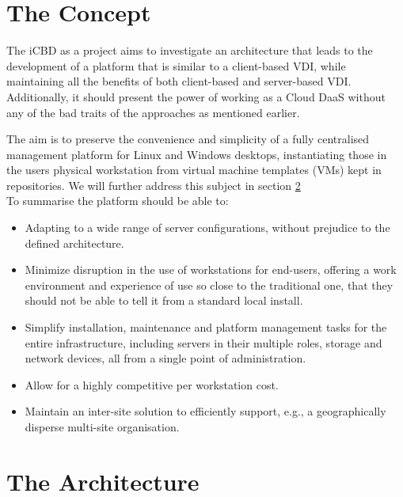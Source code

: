 \section{The Concept} %
\label{sec:icbd_concept}

The iCBD as a project aims to investigate an architecture that leads to the development of a platform that is similar to a client-based VDI, while maintaining all the benefits of both client-based and server-based VDI. Additionally, it should present the power of working as a Cloud \gls{DaaS} without any of the bad traits of the approaches as mentioned earlier.

The aim is to preserve the convenience and simplicity of a fully centralised management platform for Linux and Windows desktops, instantiating those in the users physical workstation from virtual machine templates (VMs) kept in repositories. We will further address this subject in section \ref{sec:icbd_architecture}\\

To summarise the platform should be able to:

\begin{itemize}
	\item Adapting to a wide range of server configurations, without prejudice to the defined architecture.
	\item Minimize disruption in the use of workstations for end-users, offering a work environment and experience of use so close to the traditional one, that they should not be able to tell it from a standard local install.
	\item Simplify installation, maintenance and platform management tasks for the entire infrastructure, including servers in their multiple roles, storage and network devices, all from a single point of administration.
	\item Allow for a highly competitive per workstation cost.
	\item Maintain an inter-site solution to efficiently support, e.g., a geographically disperse multi-site organisation.
\end{itemize}


\section{The Architecture} %
\label{sec:icbd_architecture}

